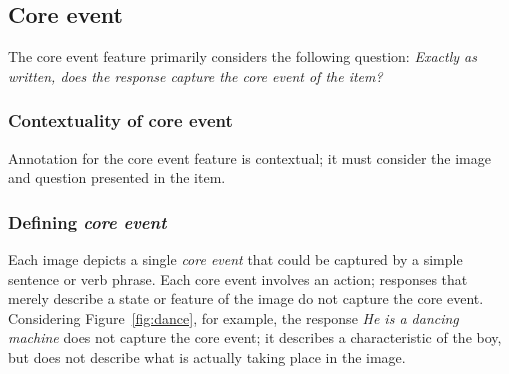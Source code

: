 \documentclass[12pt,notitlepage]{article}
\begin{document}
\subsection{Core event} \label{subsec:core-event}
The core event feature primarily considers the following question: \textit{Exactly as written, does the response capture the core event of the item?}

\subsubsection{Contextuality of core event} Annotation for the core event feature is contextual; it must consider the image and question presented in the item. 

\subsubsection{Defining \textit{core event}}
Each image depicts a single \textit{core event} that could be captured by a simple sentence or verb phrase. Each core event involves an action; responses that merely describe a state or feature of the image do not capture the core event. Considering Figure~\ref{fig:dance}, for example, the response \textit{He is a dancing machine} does not capture the core event; it describes a characteristic of the boy, but does not describe what is actually taking place in the image.
\end{document}
